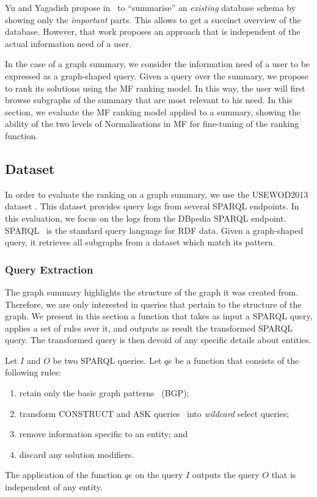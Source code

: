 Yu and Yagadish propose in~\cite{yu:2006:schema-summarization} to ``summarise'' an \emph{existing} database schema by showing only the \emph{important} parts. This allows to get a succinct overview of the database.
However, that work proposes an approach that is independent of the actual information need of a user.

In the case of a graph summary, we consider the information need of a user to be expressed as a graph-shaped query. Given a query over the summary, we propose to rank its solutions using the \gls{MF} ranking model. In this way, the user will first browse subgraphs of the summary that are most relevant to his need. In this section, we evaluate the \gls{MF} ranking model applied to a summary, showing the ability of the two levels of Normalisations in \gls{MF} for fine-tuning of the ranking function.

\subsection{Dataset}
\label{sec:summary-ranking:dataset}

In order to evaluate the ranking on a graph summary, we use the USEWOD2013 dataset \cite{usewod:2013}. This dataset provides query logs from several SPARQL endpoints. In this evaluation, we focus on the logs from the DBpedia SPARQL endpoint. SPARQL~\cite{PrudS08} is the standard query language for RDF data. Given a graph-shaped query, it retrieves all subgraphs from a dataset which match its pattern.

\subsubsection{Query Extraction}

The graph summary highlights the structure of the graph it was created from. Therefore, we are only interested in queries that pertain to the structure of the graph. We present in this section a function that takes as input a SPARQL query, applies a set of rules over it, and outputs as result the transformed SPARQL query. The transformed query is then devoid of any specific details about entities.

\begin{definition}
Let $I$ and $O$ be two SPARQL queries. Let $qe$ be a function that consists of the following rules:
\begin{enumerate}
	\item retain only the basic graph patterns~\cite{PrudS08} (BGP);
	\item transform CONSTRUCT and ASK queries~\cite{PrudS08} into \emph{wildcard} select queries;
	\item remove information specific to an entity; and
	\item discard any solution modifiers.
\end{enumerate}
The application of the function $qe$ on the query $I$ outputs the query $O$ that is independent of any entity.
\label{chap6:ranking:def:query-extraction-function}
\end{definition}

